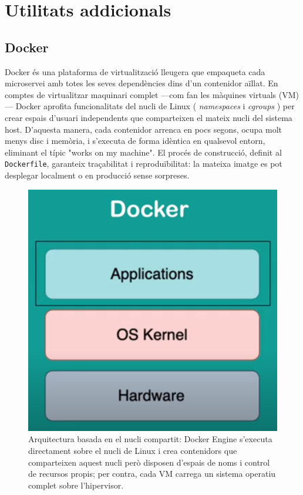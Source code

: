 \section{Utilitats addicionals}

\subsection*{Docker}

Docker és una plataforma de virtualització lleugera que empaqueta cada microservei amb totes les seves dependències dins d'un contenidor aïllat.  
En comptes de virtualitzar maquinari complet —com fan les màquines virtuals (VM)— Docker aprofita funcionalitats del nucli de Linux ( \emph{namespaces} i \emph{cgroups} ) per crear espais d'usuari independents que comparteixen el mateix nucli del sistema host.  
D'aquesta manera, cada contenidor arrenca en pocs segons, ocupa molt menys disc i memòria, i s'executa de forma idèntica en qualsevol entorn, eliminant el típic "works on my machine".  
El procés de construcció, definit al \texttt{Dockerfile}, garanteix traçabilitat i reproduïbilitat: la mateixa imatge es pot desplegar localment o en producció sense sorpreses.

\begin{figure}[H]
  \centering
  \includegraphics[width=0.45\linewidth]{Figures/117345_64a37d970df643f3a3d634fbb71c91a8~mv2.png}
  \caption{Arquitectura basada en el nucli compartit: Docker Engine s'executa directament sobre el nucli de Linux i crea contenidors que comparteixen aquest nucli però disposen d'espais de noms i control de recursos propis; per contra, cada VM carrega un sistema operatiu complet sobre l'hipervisor.}
  \label{fig:docker-arch}
\end{figure}


